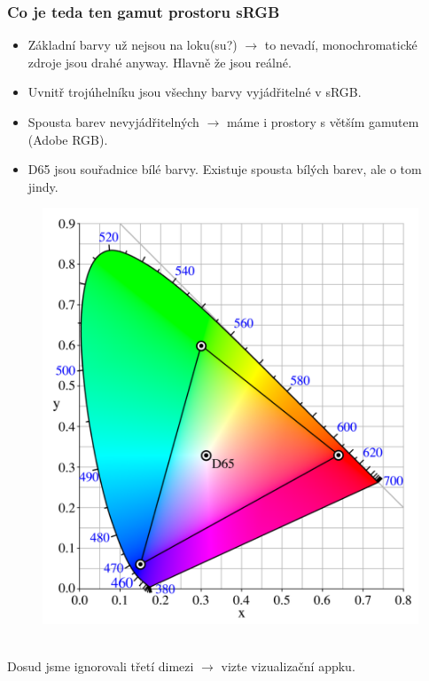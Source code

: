 \documentclass{beamer}
\begin{document}
\begin{frame}
  \frametitle{Co je teda ten gamut prostoru sRGB}
  \center
\begin{minipage}{0.6\linewidth}
  \begin{itemize}
    \item Základní barvy už nejsou na loku(su?) $\rightarrow$ to nevadí, monochromatické zdroje jsou drahé anyway. Hlavně že jsou reálné.
    \item Uvnitř trojúhelníku jsou všechny barvy vyjádřitelné v sRGB.
    \item Spousta barev nevyjádřitelných $\rightarrow$ máme i prostory s větším gamutem (Adobe RGB).
    \item D65 jsou souřadnice bílé barvy. Existuje spousta bílých barev, ale o tom jindy.
  \end{itemize}
\end{minipage}%
\begin{minipage}{0.4\linewidth}
  \begin{figure}
    \center
    \includegraphics[width=\linewidth]{CIExy1931_sRGB.png}
  \end{figure}
\end{minipage}\\[2em]
Dosud jsme ignorovali třetí dimezi $\rightarrow$ vizte vizualizační appku.
\end{frame}
\end{document}
